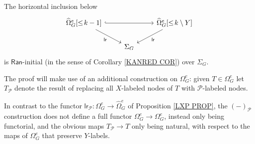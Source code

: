 \documentclass[a4paper,10pt]{article}%
\begin{document}
\begin{lemma}\label{MINUS_LAN_FINAL_LEMMA}
% 
The horizontal inclusion below 
\[
\begin{tikzcd}
	\widehat{\Omega}_G^e[\leq\! k-1]
	\arrow{dr}[swap]{\mathsf{lr}} \arrow[rr, hookrightarrow] &&
	\widehat{\Omega}_G^{e}[\leq\! k \mathbin{\backslash} Y] \arrow{dl}{\mathsf{lr}}
\\
	&
	\Sigma_G
\end{tikzcd}
\]  
is $\mathsf{Ran}$-initial (in the sense of Corollary \ref{KANRED COR})
over $\Sigma_G$.  
\end{lemma}

The proof will make use of an additional construction on 
$\Omega_{G}^e$: given $T \in \Omega_{G}^e$ let $T_{\mathcal{P}}$ denote the result of replacing all $X$-labeled nodes of $T$ with $\mathcal{P}$-labeled nodes.

\begin{remark}\label{YINERT REM}
	In contrast to the functor
	$\mathsf{lr}_{\mathcal{P}} \colon
	\Omega_G^e \to \widehat{\Omega}_G^e $
	of Proposition \ref{LXP PROP},
	the $(\minus)_{\mathcal{P}}$ construction 
	does not define a full functor
        $\Omega_G^e \to \Omega_G^e$, instead only being functorial, and the obvious maps $T_{\mathcal{P}} \to T$ only being natural,
        with respect to the
        maps of $\Omega_G^e$ that preserve $Y$-labels.
\end{remark}
\end{document}
